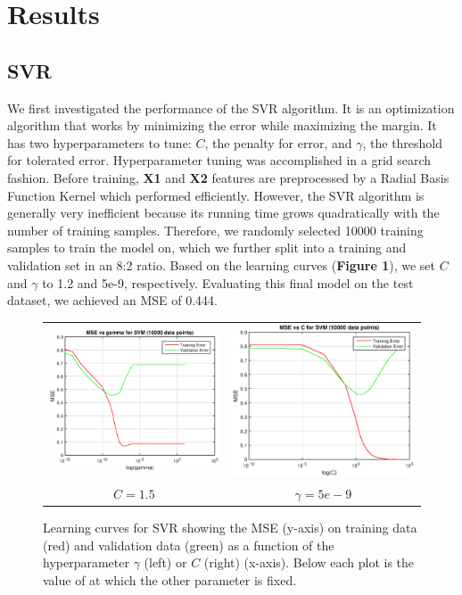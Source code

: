 \documentclass[12pt] {article}
\renewcommand{\baselinestretch}{1.2} %
\begin{document}
\section{Results}
\subsection{SVR}
We first investigated the performance of the SVR algorithm. It is an optimization algorithm that works by minimizing the error while maximizing the margin. It has two hyperparameters to tune: $C$, the penalty for error, and $\gamma$, the threshold for tolerated error. Hyperparameter tuning was accomplished in a grid search fashion. Before training, \textbf{X1} and \textbf{X2} features are preprocessed by a Radial Basis Function Kernel which performed efficiently. However, the SVR algorithm is generally very inefficient because its running time grows quadratically with the number of training samples. Therefore, we randomly selected 10000 training samples to train the model on, which we further split into a training and validation set in an 8:2 ratio. Based on the learning curves (\textbf{Figure 1}), we set $C$ and $\gamma$ to 1.2 and 5e-9, respectively. Evaluating this final model on the test dataset, we achieved an MSE of 0.444.

\renewcommand{\baselinestretch}{1.0} %
\begin{figure}[h!] \centering
\begin{tabular}{cc}
\includegraphics[width=.45\textwidth]{figdir/svmgamma10000.eps} &
\includegraphics[width=.45\textwidth]{figdir/svmc10000.eps} \\
$C=1.5$ & $\gamma=5e-9$ \\
\end{tabular}
\caption{Learning curves for SVR showing the MSE (y-axis) on training data (red) and validation data (green) as a function of the hyperparameter $\gamma$ (left) or $C$ (right) (x-axis). Below each plot is the value of at which the other parameter is fixed.}
\end{figure}
\renewcommand{\baselinestretch}{1.2} %
\end{document}
